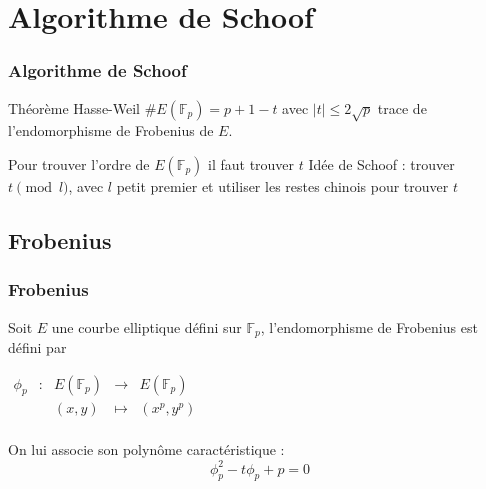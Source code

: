 \documentclass{beamer}
\begin{document}
\section{Algorithme de Schoof}
\begin{frame}
\frametitle{Algorithme de Schoof}

\begin{block}{Théorème Hasse-Weil}
$\#E(\mathbb{F}_p) = p + 1 - t$ avec $|t| \leq 2 \sqrt{p}$ trace de l'endomorphisme de Frobenius de $E$.
\end{block}
Pour trouver l'ordre de $E(\mathbb{F}_p)$ il faut trouver $t$
\newline
Idée de Schoof : trouver $t \pmod l$, avec $l$ petit premier et utiliser les restes chinois pour trouver $t$
\end{frame}

\subsection{Frobenius}
\begin{frame}
\frametitle{Frobenius}
Soit $E$ une courbe elliptique défini sur $\mathbb{F}_p$, l'endomorphisme de Frobenius est défini par 

$\begin{array}{ccccc}
\phi_p & : & E(\mathbb{F}_p) & \to & E(\mathbb{F}_p) \\
 & & (x,y) & \mapsto & (x^p, y^p) \\
\end{array}$

On lui associe son polynôme caractéristique :
\begin{equation*}
\phi_p^2 - t \phi_p + p = 0
\end{equation*}
\end{frame}
\end{document}
